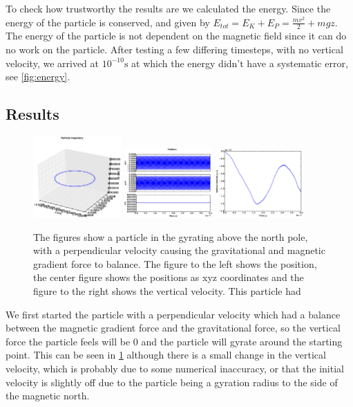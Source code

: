 \documentclass[x11names]{article}
\begin{document}
    To check how trustworthy the results are we calculated the energy. Since the energy of the particle is conserved, and given by \(E_{tot} = E_K + E_P = \frac{mv^2}{2} + mgz\). The energy of the particle is not dependent on the magnetic field since it can do no work on the particle. After testing a few differing timesteps, with no vertical velocity, we arrived at \(10^{-10}\si{\second}\) at which the energy didn't have a systematic error, see \cref{fig:energy}.


  \subsection{Results}
  \begin{figure}
      \centering
      \includegraphics[width = 0.30\textwidth]{figures/6-0/3Dplot}
      \includegraphics[width = 0.30\textwidth]{figures/6-0/xyz}
      \includegraphics[width = 0.30\textwidth]{figures/6-0/vertical_vel}
      \caption{The figures show a particle in the gyrating above the north pole, with a perpendicular velocity causing the gravitational and magnetic gradient force to balance. The figure to the left shows the position, the center figure shows the positions as xyz coordinates and the figure to the right shows the vertical velocity. This particle had }
      \label{fig:no_perturbation}
    \end{figure}

  We first started the particle with a perpendicular velocity which had a balance between the magnetic gradient force and the gravitational force, so the vertical force the particle feels will be \(0\) and the particle will gyrate around the starting point. This can be seen in \cref{fig:no_perturbation} although there is a small change in the vertical velocity, which is probably due to some numerical inaccuracy, or that the initial velocity is slightly off due to the particle being a gyration radius to the side of the magnetic north.
\end{document}
